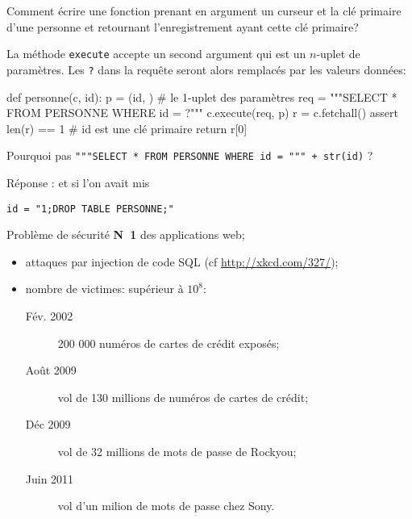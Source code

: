 Comment écrire une fonction prenant en argument un curseur et la clé
primaire d'une personne et retournant l'enregistrement ayant cette clé
primaire?

La méthode \lstinline{execute} accepte un second argument qui est
un $n$-uplet de paramètres. Les \og{}\texttt{?}\fg{} dans la requête
seront alors remplacés par les valeurs données:
\begin{pyverbatim}
def personne(c, id):
  p = (id, ) # le 1-uplet des paramètres
  req = """SELECT * FROM PERSONNE WHERE id = ?"""
  c.execute(req, p)
  r = c.fetchall()
  assert len(r) == 1 # id est une clé primaire
  return r[0]
\end{pyverbatim}

Pourquoi pas {\small 
\texttt{"""SELECT * FROM PERSONNE WHERE id = """ + str(id)}
}?

Réponse : et si l'on avait mis 
\begin{verbatim}
id = "1;DROP TABLE PERSONNE;"
\end{verbatim}

Problème de sécurité \textbf{N~1} des applications web;
\begin{itemize}
\item attaques par injection de code SQL
(cf
\url{http://xkcd.com/327/});
\item nombre de victimes: supérieur à $10^{8}$:
  \begin{description}
  \item[Fév. 2002] 200 000 numéros de cartes de crédit exposés;
  \item[Août 2009] vol de 130 millions de numéros de cartes de crédit;
  \item[Déc 2009] vol de 32 millions de mots de passe de Rockyou;
  \item[Juin 2011] vol d'un milion de mots de passe chez Sony.
  \end{description}
\end{itemize}